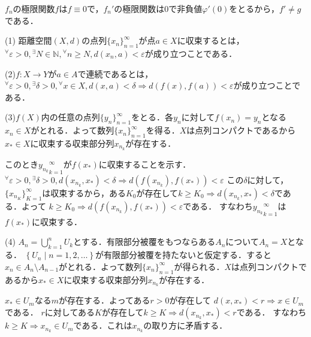 \documentclass[
		book,
		head_space=20mm,
		foot_space=20mm,
		gutter=10mm,
		line_length=190mm
]{jlreq}
\begin{document}
$f_n$の極限関数$f$は$f\equiv 0$で，$f_n'$の極限関数は$0$で非負値$\varphi'(0)
$をとるから，$f'\neq g$である．

(1) 距離空間$(X,d)$の点列$\{x_n\}_{n=1}^{\infty}$が点$a\in X$に収束するとは，${}^{\forall}\varepsilon>0,{}^{\exists} N \in \mathbb{N},{}^{\forall}n \ge N, d(x_n,a)<\varepsilon$が成り立つことである．

(2)$f\colon X \rightarrow Y$が$a \in A$で連続であるとは，
${}^{\forall}\varepsilon>0,{}^{\exists}\delta>0,{}^{\forall}x \in X, d(x,a)<\delta \Rightarrow d(f(x),f(a))<\varepsilon$が成り立つことである．

(3)$f(X)$内の任意の点列$\{y_n\}_{n=1}^{\infty}$をとる．各$y_n$に対して$f(x_n)=y_n$となる$x_n \in X$がとれる．よって数列$\{ x_n \}_{n=1}^{\infty}$を得る．$X$は点列コンパクトであるから$x_*\in X$に収束する収束部分列$x_{n_k}$が存在する．

このとき${y_{n_k}}_{k=1}^{\infty}$が$f(x_*)$に収束することを示す．
${}^{\forall}\varepsilon>0,{}^{\exists} \delta >0 ,d(x_{n_k},x_*)<\delta \Rightarrow d(f(x_{n_k}),f(x_*))<\varepsilon$
この$\delta$に対して，$\{ x_{n_K}\}_{K=1}^{\infty}$は収束するから，ある$K_0$が存在して$k \ge K_0 \Rightarrow d(x_{n_k},x_*)<\delta$である．よって
$k \ge K_0 \Rightarrow d(f(x_{n_k}),f(x_*))<\varepsilon$である．
すなわち${y_{n_k}}_{k=1}^{\infty}$は$f(x_*)$に収束する．

(4) $A_n=\bigcup\limits_{k=1}^n U_k$とする．有限部分被覆をもつならある$A_n$について$A_n=X$となる．
$\left\{ U_n\mid n=1,2,\dots \right\}$が有限部分被覆を持たないと仮定する．すると$x_n \in A_n \setminus A_{n-1}$がとれる．よって数列$\{x_n\}_{n=1}^{\infty}$が得られる．$X$は点列コンパクトであるから$x_*\in X$に収束する収束部分列$x_{n_k}$が存在する．

$x_* \in U_m$なる$m$が存在する．よってある$r>0$が存在して
$d(x,x_*)<r\Rightarrow x \in U_m$である．
$r$に対してある$K$が存在して$k \ge K \Rightarrow d(x_{n_k},x_*)<r$である．
すなわち$k \ge K \Rightarrow x_{n_k} \in U_m$である．これは$x_{n_k}$の取り方に矛盾する．
\end{document}
